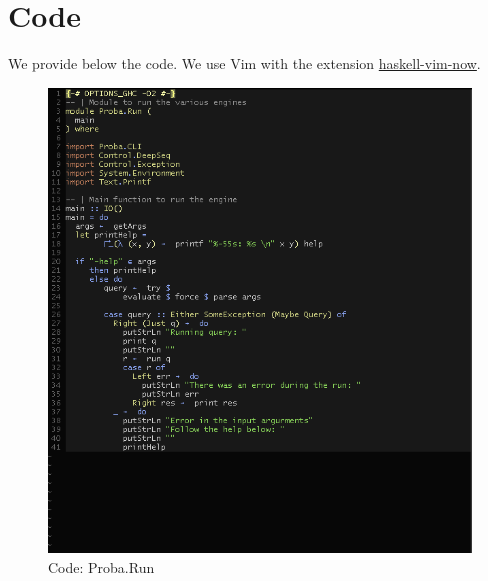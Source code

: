 \documentclass[12pt,a4paper,titlepage]{article}
\begin{document}
\section{Code} \label{apx:code}
We provide below the code. We use Vim with the extension 
\href{https://github.com/begriffs/haskell-vim-now}{haskell-vim-now}.
\begin{figure}[h!]
\centering
\includegraphics[width=1\textwidth]{img/code-run.png}
\caption{Code: Proba.Run}
\label{fig:core.run}
\end{figure}
\end{document}
